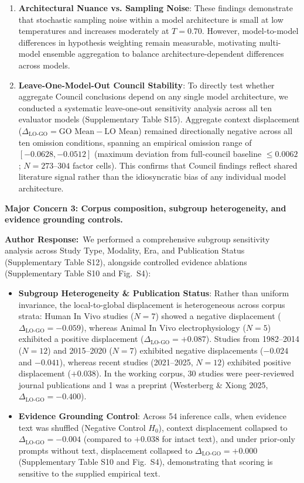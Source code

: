 \documentclass[11pt]{article}
\newcommand{\reviewercomment}[1]{\vspace{1em}\noindent\textbf{\color{blue!80!black}#1}\vspace{0.4em}}
\newcommand{\authorsresponse}{\noindent\textbf{\color{black}Author Response:}\ }
\begin{document}
\begin{enumerate}[leftmargin=*,noitemsep]
\item \textbf{Architectural Nuance vs. Sampling Noise}: 
These findings demonstrate that stochastic sampling noise within a model architecture is small at low temperatures and increases moderately at $T=0.70$. However, model-to-model differences in hypothesis weighting remain measurable, motivating multi-model ensemble aggregation to balance architecture-dependent differences across models.

\item \textbf{Leave-One-Model-Out Council Stability}: 
To directly test whether aggregate Council conclusions depend on any single model architecture, we conducted a systematic leave-one-out sensitivity analysis across all ten evaluator models (Supplementary Table S15). Aggregate context displacement ($\Delta_{\text{LO-GO}} = \text{GO Mean} - \text{LO Mean}$) remained directionally negative across all ten omission conditions, spanning an empirical omission range of $[-0.0628, -0.0512]$ (maximum deviation from full-council baseline $\le 0.0062$; $N=273\text{--}304$ factor cells). This confirms that Council findings reflect shared literature signal rather than the idiosyncratic bias of any individual model architecture.
\end{enumerate}

\reviewercomment{Major Concern 3: Corpus composition, subgroup heterogeneity, and evidence grounding controls.}

\authorsresponse We performed a comprehensive subgroup sensitivity analysis across Study Type, Modality, Era, and Publication Status (Supplementary Table S12), alongside controlled evidence ablations (Supplementary Table S10 and Fig.~S4):
\begin{itemize}[leftmargin=*,noitemsep]
\item \textbf{Subgroup Heterogeneity \& Publication Status}: Rather than uniform invariance, the local-to-global displacement is heterogeneous across corpus strata: Human In Vivo studies ($N=7$) showed a negative displacement ($\Delta_{\text{LO-GO}} = -0.059$), whereas Animal In Vivo electrophysiology ($N=5$) exhibited a positive displacement ($\Delta_{\text{LO-GO}} = +0.087$). Studies from 1982--2014 ($N=12$) and 2015--2020 ($N=7$) exhibited negative displacements ($-0.024$ and $-0.041$), whereas recent studies (2021--2025, $N=12$) exhibited positive displacement ($+0.038$). In the working corpus, 30 studies were peer-reviewed journal publications and 1 was a preprint (Westerberg \& Xiong 2025, $\Delta_{\text{LO-GO}} = -0.400$).
\item \textbf{Evidence Grounding Control}: Across 54 inference calls, when evidence text was shuffled (Negative Control $H_0$), context displacement collapsed to $\Delta_{\text{LO-GO}} = -0.004$ (compared to $+0.038$ for intact text), and under prior-only prompts without text, displacement collapsed to $\Delta_{\text{LO-GO}} = +0.000$ (Supplementary Table S10 and Fig.~S4), demonstrating that scoring is sensitive to the supplied empirical text.
\end{itemize}
\end{document}
